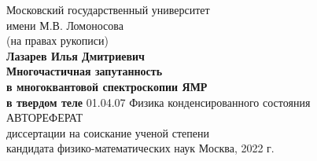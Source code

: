\begin{titlepage}
\vfill
\begin{center}
  {\large
    Московский государственный университет \\
    имени М.В. Ломоносова
  } \\
  \vfill
  (на правах рукописи) \\
  \vfill
  {\Large \bf Лазарев Илья Дмитриевич} \\
  \vspace{1cm}
  {\Large \bf
      Многочастичная запутанность \\
      в многоквантовой спектроскопии ЯМР \\
      \vspace{2mm}
      в твердом теле
  }
 \vfill
 01.04.07 Физика конденсированного состояния \\
 \vspace{1cm}
 АВТОРЕФЕРАТ \\
 диссертации на соискание ученой степени \\
 кандидата физико-математических наук
 \vfill
 Москва, 2022 г.
\end{center}
\end{titlepage}